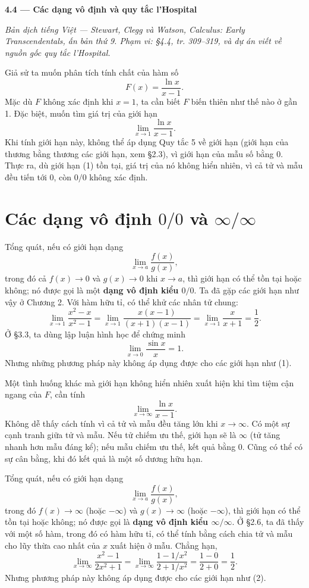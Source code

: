 \documentclass[12pt,a4paper]{article}
\begin{document}
\begin{center}{\Large\bfseries 4.4 — Các dạng vô định và quy tắc l’Hospital}\end{center}
\noindent\textit{Bản dịch tiếng Việt — Stewart, Clegg và Watson, Calculus: Early Transcendentals, ấn bản thứ 9. Phạm vi: §4.4, tr. 309–319, và dự án viết về nguồn gốc quy tắc l’Hospital.}

Giả sử ta muốn phân tích tính chất của hàm số
\[F(x)=\frac{\ln x}{x-1}.\]
Mặc dù $F$ không xác định khi $x=1$, ta cần biết $F$ biến thiên như thế nào ở gần 1. Đặc biệt, muốn tìm giá trị của giới hạn
\[\lim_{x\to1}\frac{\ln x}{x-1}.\tag{1}\]
Khi tính giới hạn này, không thể áp dụng Quy tắc 5 về giới hạn (giới hạn của thương bằng thương các giới hạn, xem §2.3), vì giới hạn của mẫu số bằng 0. Thực ra, dù giới hạn (1) tồn tại, giá trị của nó không hiển nhiên, vì cả tử và mẫu đều tiến tới 0, còn $0/0$ không xác định.
\section*{Các dạng vô định $0/0$ và $\infty/\infty$}
Tổng quát, nếu có giới hạn dạng
\[\lim_{x\to a}\frac{f(x)}{g(x)},\]
trong đó cả $f(x)\to0$ và $g(x)\to0$ khi $x\to a$, thì giới hạn có thể tồn tại hoặc không; nó được gọi là một \textbf{dạng vô định kiểu $0/0$}. Ta đã gặp các giới hạn như vậy ở Chương 2. Với hàm hữu tỉ, có thể khử các nhân tử chung:
\[\lim_{x\to1}\frac{x^2-x}{x^2-1}
=\lim_{x\to1}\frac{x(x-1)}{(x+1)(x-1)}
=\lim_{x\to1}\frac{x}{x+1}=\frac12.\]
Ở §3.3, ta dùng lập luận hình học để chứng minh
\[\lim_{x\to0}\frac{\sin x}{x}=1.\]
Nhưng những phương pháp này không áp dụng được cho các giới hạn như (1).

Một tình huống khác mà giới hạn không hiển nhiên xuất hiện khi tìm tiệm cận ngang của $F$, cần tính
\[\lim_{x\to\infty}\frac{\ln x}{x-1}.\tag{2}\]
Không dễ thấy cách tính vì cả tử và mẫu đều tăng lớn khi $x\to\infty$. Có một sự cạnh tranh giữa tử và mẫu. Nếu tử chiếm ưu thế, giới hạn sẽ là $\infty$ (tử tăng nhanh hơn mẫu đáng kể); nếu mẫu chiếm ưu thế, kết quả bằng 0. Cũng có thể có sự cân bằng, khi đó kết quả là một số dương hữu hạn.

Tổng quát, nếu có giới hạn dạng
\[\lim_{x\to a}\frac{f(x)}{g(x)},\]
trong đó $f(x)\to\infty$ (hoặc $-\infty$) và $g(x)\to\infty$ (hoặc $-\infty$), thì giới hạn có thể tồn tại hoặc không; nó được gọi là \textbf{dạng vô định kiểu $\infty/\infty$}. Ở §2.6, ta đã thấy với một số hàm, trong đó có hàm hữu tỉ, có thể tính bằng cách chia tử và mẫu cho lũy thừa cao nhất của $x$ xuất hiện ở mẫu. Chẳng hạn,
\[\lim_{x\to\infty}\frac{x^2-1}{2x^2+1}
=\lim_{x\to\infty}\frac{1-1/x^2}{2+1/x^2}
=\frac{1-0}{2+0}=\frac12.\]
Nhưng phương pháp này không áp dụng được cho các giới hạn như (2).
\end{document}
